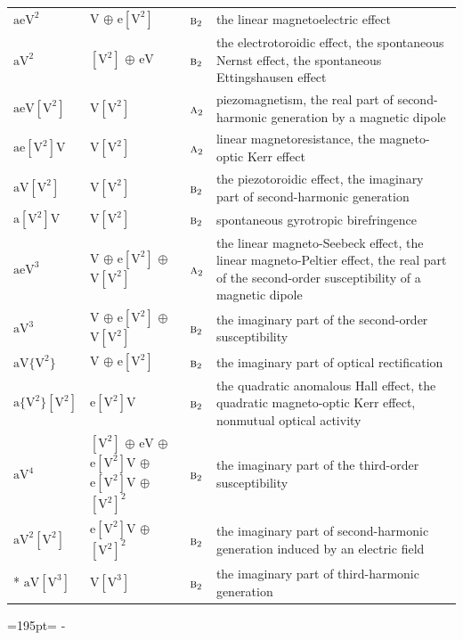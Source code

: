 \documentclass[10pt,a4paper]{article}
\newcommand{\needspace}[1]{\par\penalty-100\begingroup\dimen0=#1\relax\dimen2=\pagegoal
  \advance\dimen2-\pagetotal\ifdim\dimen0>\dimen2\relax\ifdim\dimen2>0pt\vfil\break\fi\fi
  \endgroup}
\numberwithin{equation}{section}
\newcommand{\irr}[1]{\text{\normalfont\scshape #1}}
\newcommand{\jahn}[1]{\mathrm{#1}}
\newlength{\fillwidth}\newlength{\cellwidth}\newlength{\colwidth}
\begin{document}
{\begin{longtable}{@{}lll>{\RaggedRight\arraybackslash}p{\fillwidth}@{}}
$\jahn{aeV^{2}}$ & $\jahn{V}$ $\oplus$ $\jahn{e[V^{2}]}$ & $\irr{b}_{2}$ & the linear magnetoelectric effect\\
$\jahn{aV^{2}}$ & $\jahn{[V^{2}]}$ $\oplus$ $\jahn{eV}$ & $\irr{b}_{2}$ & the electrotoroidic effect, the spontaneous Nernst effect, the spontaneous Ettingshausen effect\\
$\jahn{aeV[V^{2}]}$ & $\jahn{V[V^{2}]}$ & $\irr{a}_{2}$ & piezomagnetism, the real part of second-harmonic generation by a magnetic dipole\\
$\jahn{ae[V^{2}]V}$ & $\jahn{V[V^{2}]}$ & $\irr{a}_{2}$ & linear magnetoresistance, the magneto-optic Kerr effect\\
$\jahn{aV[V^{2}]}$ & $\jahn{V[V^{2}]}$ & $\irr{b}_{2}$ & the piezotoroidic effect, the imaginary part of second-harmonic generation\\
$\jahn{a[V^{2}]V}$ & $\jahn{V[V^{2}]}$ & $\irr{b}_{2}$ & spontaneous gyrotropic birefringence\\
$\jahn{aeV^{3}}$ & $\jahn{V}$ $\oplus$ $\jahn{e[V^{2}]}$ $\oplus$ $\jahn{V[V^{2}]}$ & $\irr{a}_{2}$ & the linear magneto-Seebeck effect, the linear magneto-Peltier effect, the real part of the second-order susceptibility of a magnetic dipole\\
$\jahn{aV^{3}}$ & $\jahn{V}$ $\oplus$ $\jahn{e[V^{2}]}$ $\oplus$ $\jahn{V[V^{2}]}$ & $\irr{b}_{2}$ & the imaginary part of the second-order susceptibility\\
$\jahn{aV\{V^{2}\}}$ & $\jahn{V}$ $\oplus$ $\jahn{e[V^{2}]}$ & $\irr{b}_{2}$ & the imaginary part of optical rectification\\
$\jahn{a\{V^{2}\}[V^{2}]}$ & $\jahn{e[V^{2}]V}$ & $\irr{b}_{2}$ & the quadratic anomalous Hall effect, the quadratic magneto-optic Kerr effect, nonmutual optical activity\\
$\jahn{aV^{4}}$ & $\jahn{[V^{2}]}$ $\oplus$ $\jahn{eV}$ $\oplus$ $\jahn{e[V^{2}]V}$ $\oplus$ $\jahn{e[V^{2}]V}$ $\oplus$ $\jahn{[V^{2}]^{2}}$ & $\irr{b}_{2}$ & the imaginary part of the third-order susceptibility\\
$\jahn{aV^{2}[V^{2}]}$ & $\jahn{e[V^{2}]V}$ $\oplus$ $\jahn{[V^{2}]^{2}}$ & $\irr{b}_{2}$ & the imaginary part of second-harmonic generation induced by an electric field\\*
$\jahn{aV[V^{3}]}$ & $\jahn{V[V^{3}]}$ & $\irr{b}_{2}$ & the imaginary part of third-harmonic generation\\
\bottomrule\end{longtable}}
\needspace{195pt}
\end{document}
